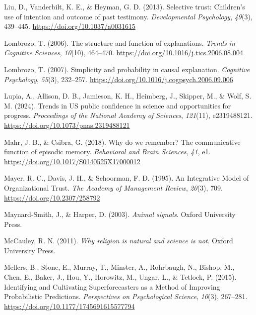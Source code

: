 \documentclass[
  man,
  floatsintext,
  longtable,
  nolmodern,
  notxfonts,
  notimes,
  colorlinks=true,linkcolor=blue,citecolor=blue,urlcolor=blue]{apa7}
\newlength{\cslhangindent}
\newenvironment{CSLReferences}[2] %
 {\begin{list}{}{%
  \setlength{\itemindent}{0pt}
  \setlength{\leftmargin}{0pt}
  \setlength{\parsep}{0pt}
  \ifodd #1
   \setlength{\leftmargin}{\cslhangindent}
   \setlength{\itemindent}{-1\cslhangindent}
  \fi
  \setlength{\itemsep}{#2\baselineskip}}}
 {\end{list}}
\begin{document}
\begin{CSLReferences}{1}{0}
Liu, D., Vanderbilt, K. E., \& Heyman, G. D. (2013). Selective trust:
Children's use of intention and outcome of past testimony.
\emph{Developmental Psychology}, \emph{49}(3), 439--445.
\url{https://doi.org/10.1037/a0031615}

Lombrozo, T. (2006). The structure and function of explanations.
\emph{Trends in Cognitive Sciences}, \emph{10}(10), 464--470.
\url{https://doi.org/10.1016/j.tics.2006.08.004}

Lombrozo, T. (2007). Simplicity and probability in causal explanation.
\emph{Cognitive Psychology}, \emph{55}(3), 232--257.
\url{https://doi.org/10.1016/j.cogpsych.2006.09.006}

Lupia, A., Allison, D. B., Jamieson, K. H., Heimberg, J., Skipper, M.,
\& Wolf, S. M. (2024). Trends in US public confidence in science and
opportunities for progress. \emph{Proceedings of the National Academy of
Sciences}, \emph{121}(11), e2319488121.
\url{https://doi.org/10.1073/pnas.2319488121}

Mahr, J. B., \& Csibra, G. (2018). Why do we remember? The communicative
function of episodic memory. \emph{Behavioral and Brain Sciences},
\emph{41}, e1. \url{https://doi.org/10.1017/S0140525X17000012}

Mayer, R. C., Davis, J. H., \& Schoorman, F. D. (1995). An Integrative
Model of Organizational Trust. \emph{The Academy of Management Review},
\emph{20}(3), 709. \url{https://doi.org/10.2307/258792}

Maynard-Smith, J., \& Harper, D. (2003). \emph{Animal signals}. Oxford
University Press.

McCauley, R. N. (2011). \emph{Why religion is natural and science is
not}. Oxford University Press.

Mellers, B., Stone, E., Murray, T., Minster, A., Rohrbaugh, N., Bishop,
M., Chen, E., Baker, J., Hou, Y., Horowitz, M., Ungar, L., \& Tetlock,
P. (2015). Identifying and Cultivating Superforecasters as a Method of
Improving Probabilistic Predictions. \emph{Perspectives on Psychological
Science}, \emph{10}(3), 267--281.
\url{https://doi.org/10.1177/1745691615577794}


\end{CSLReferences}
\end{document}
